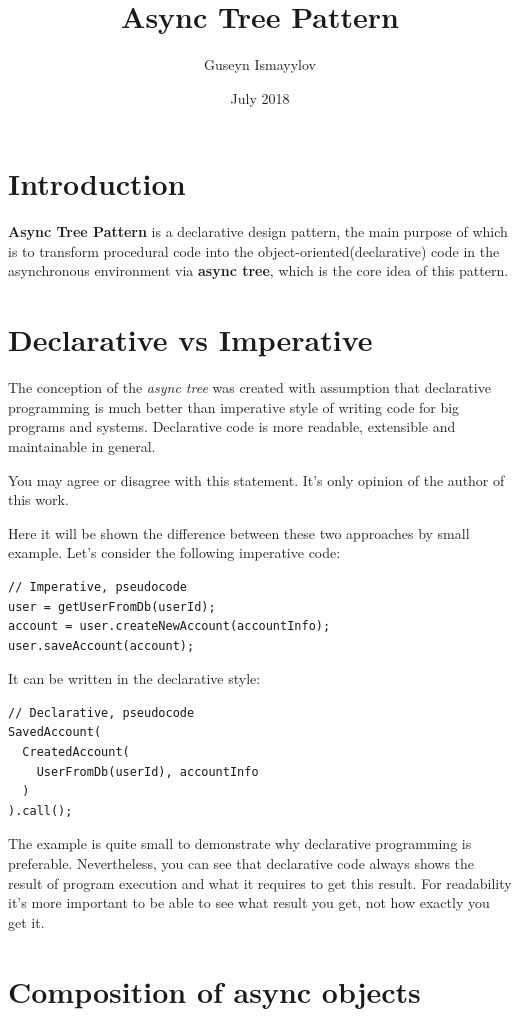 \documentclass{article}
\title{Async Tree Pattern}
\author{Guseyn Ismayylov}
\date{July 2018}
\begin{document}
\maketitle

\section{Introduction}

\textbf{Async Tree Pattern} is a declarative design pattern, the main purpose of which is to transform procedural code into the object-oriented(declarative) code in the asynchronous environment via \textbf{async tree}, which is the core idea of this pattern.

\section{Declarative vs Imperative}

The conception of the \textit{async tree} was created with assumption that declarative programming is much better than imperative style of writing code for big programs and systems. Declarative code is more readable, extensible and maintainable in general.

You may agree or disagree with this statement. It's only opinion of the author of this work.

Here it will be shown the difference between these two approaches by small example. Let's consider the following imperative code:  

\begin{lstlisting}
// Imperative, pseudocode
user = getUserFromDb(userId);
account = user.createNewAccount(accountInfo);
user.saveAccount(account);
\end{lstlisting}

It can be written in the declarative style:

\begin{lstlisting}
// Declarative, pseudocode
SavedAccount(
  CreatedAccount(
    UserFromDb(userId), accountInfo
  )
).call();
\end{lstlisting}

The example is quite small to demonstrate why declarative programming is preferable. Nevertheless, you can see that declarative code always shows the result of program execution and what it requires to get this result. For readability it's more important to be able to see what result you get, not how exactly you get it.

\section{Composition of async objects}
\end{document}
